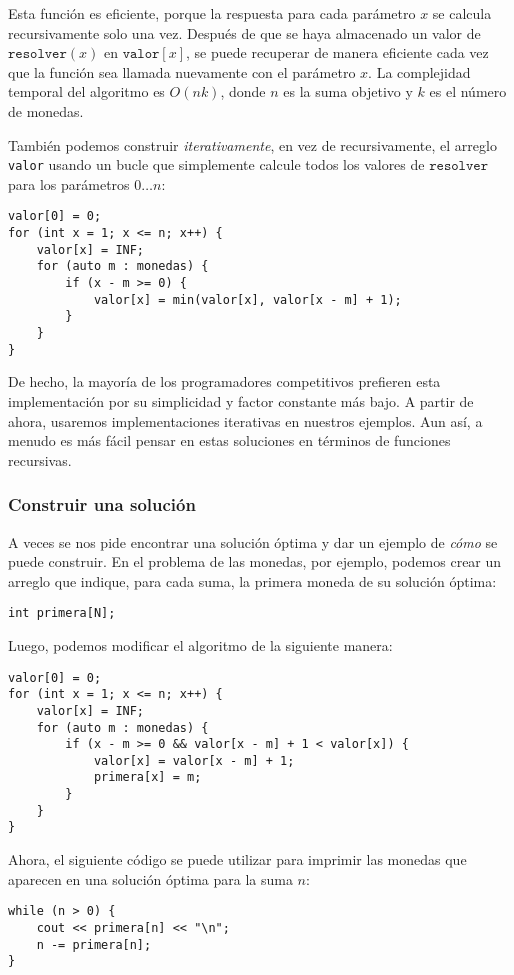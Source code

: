 Esta función es eficiente, porque la respuesta para cada parámetro $x$
se calcula recursivamente solo una vez.
Después de que se haya almacenado un valor de
$\texttt{resolver}(x)$ en $\texttt{valor}[x]$,
se puede recuperar de manera eficiente cada vez que
la función sea llamada nuevamente con el parámetro $x$.
La complejidad temporal del algoritmo es $O(nk)$,
donde $n$ es la suma objetivo y $k$ es el número de monedas.

También podemos construir \emph{iterativamente},
en vez de recursivamente,
el arreglo \texttt{valor} usando
un bucle que simplemente calcule todos los valores
de $\texttt{resolver}$ para los parámetros $0 \ldots n$:
\begin{lstlisting}
valor[0] = 0;
for (int x = 1; x <= n; x++) {
    valor[x] = INF;
    for (auto m : monedas) {
        if (x - m >= 0) {
            valor[x] = min(valor[x], valor[x - m] + 1);
        }
    }
}
\end{lstlisting}

De hecho, la mayoría de los programadores competitivos prefieren esta
implementación por su simplicidad y factor constante más bajo.
A partir de ahora, usaremos implementaciones iterativas
en nuestros ejemplos.
Aun así, a menudo es más fácil pensar en estas soluciones
en términos de funciones recursivas.

\subsubsection{Construir una solución}

A veces se nos pide encontrar una solución óptima y dar
un ejemplo de \emph{cómo} se puede construir.
En el problema de las monedas, por ejemplo,
podemos crear un arreglo que indique, para cada suma,
la primera moneda de su solución óptima:
\begin{lstlisting}
int primera[N];
\end{lstlisting}
Luego, podemos modificar el algoritmo de la siguiente manera:
\begin{lstlisting}
valor[0] = 0;
for (int x = 1; x <= n; x++) {
    valor[x] = INF;
    for (auto m : monedas) {
        if (x - m >= 0 && valor[x - m] + 1 < valor[x]) {
            valor[x] = valor[x - m] + 1;
            primera[x] = m;
        }
    }
}
\end{lstlisting}
Ahora, el siguiente código se puede utilizar para
imprimir las monedas que aparecen en una solución óptima para
la suma $n$:
\begin{lstlisting}
while (n > 0) {
    cout << primera[n] << "\n";
    n -= primera[n];
}
\end{lstlisting}

